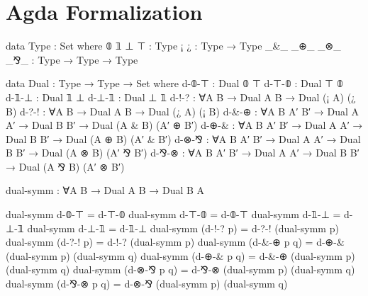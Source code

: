 \section{Agda Formalization}
\label{sec:formalization}

\begin{code}
data Type : Set where
  𝟘 𝟙 ⊥ ⊤ : Type
  ¡ ¿ : Type → Type
  _&_ _⊕_ _⊗_ _⅋_ : Type → Type → Type
\end{code}

\begin{code}
data Dual : Type → Type → Set where
  d-𝟘-⊤ : Dual 𝟘 ⊤
  d-⊤-𝟘 : Dual ⊤ 𝟘
  d-𝟙-⊥ : Dual 𝟙 ⊥
  d-⊥-𝟙 : Dual ⊥ 𝟙
  d-!-? : ∀{A B} → Dual A B → Dual (¡ A) (¿ B)
  d-?-! : ∀{A B} → Dual A B → Dual (¿ A) (¡ B)
  d-&-⊕ : ∀{A B A′ B′} → Dual A A′ → Dual B B′ → Dual (A & B) (A′ ⊕ B′)
  d-⊕-& : ∀{A B A′ B′} → Dual A A′ → Dual B B′ → Dual (A ⊕ B) (A′ & B′)
  d-⊗-⅋ : ∀{A B A′ B′} → Dual A A′ → Dual B B′ → Dual (A ⊗ B) (A′ ⅋ B′)
  d-⅋-⊗ : ∀{A B A′ B′} → Dual A A′ → Dual B B′ → Dual (A ⅋ B) (A′ ⊗ B′)
\end{code}

\begin{code}
dual-symm : ∀{A B} → Dual A B → Dual B A
\end{code}
\begin{code}[hide]
dual-symm d-𝟘-⊤ = d-⊤-𝟘
dual-symm d-⊤-𝟘 = d-𝟘-⊤
dual-symm d-𝟙-⊥ = d-⊥-𝟙
dual-symm d-⊥-𝟙 = d-𝟙-⊥
dual-symm (d-!-? p) = d-?-! (dual-symm p)
dual-symm (d-?-! p) = d-!-? (dual-symm p)
dual-symm (d-&-⊕ p q) = d-⊕-& (dual-symm p) (dual-symm q)
dual-symm (d-⊕-& p q) = d-&-⊕ (dual-symm p) (dual-symm q)
dual-symm (d-⊗-⅋ p q) = d-⅋-⊗ (dual-symm p) (dual-symm q)
dual-symm (d-⅋-⊗ p q) = d-⊗-⅋ (dual-symm p) (dual-symm q)
\end{code}